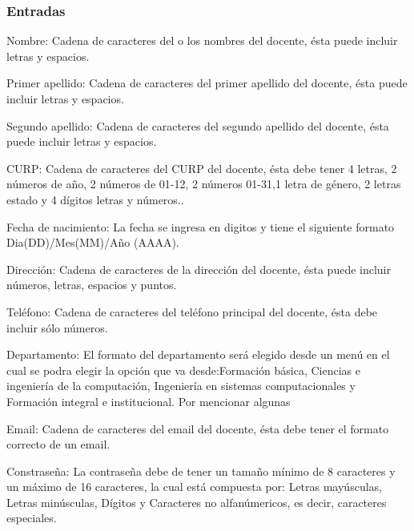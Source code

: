 \subsubsection{Entradas}
	\begin{Citemize}
		\item Nombre: Cadena de caracteres del o los nombres del docente, ésta puede incluir letras y espacios. 
		\item Primer apellido: Cadena de caracteres del primer apellido del docente, ésta puede incluir letras y espacios. 
		\item Segundo apellido: Cadena de caracteres del segundo apellido del docente, ésta puede incluir letras y espacios. 
		\item CURP: Cadena de caracteres del CURP del docente, ésta debe tener 4 letras, 2 números de año, 2 números de 01-12, 2 números 01-31,1 letra de género, 2 letras estado y 4 dígitos letras y números.. 
		\item Fecha de nacimiento: La fecha se ingresa en digitos y tiene el siguiente formato Dia(DD)/Mes(MM)/Año (AAAA).
		\item Dirección: Cadena de caracteres de la dirección del docente, ésta puede incluir números, letras, espacios y puntos. 
		\item Teléfono: Cadena de caracteres del teléfono principal del docente, ésta debe incluir sólo números. 
		\item Departamento: El formato del departamento será elegido desde un menú en el cual se podra elegir la opción que va desde:Formación básica, Ciencias e ingeniería de la computación, Ingeniería en sistemas computacionales y Formación integral e institucional. Por mencionar algunas
		\item Email: Cadena de caracteres del email del docente, ésta debe tener el formato correcto de un email. 
		\item Constraseña: La contraseña debe de tener un tamaño mínimo de 8 caracteres y un máximo de 16 caracteres, la cual está compuesta por: Letras mayúsculas, Letras minúsculas, Dígitos y Caracteres no alfanúmericos, es decir, caracteres especiales.

	\end{Citemize}		